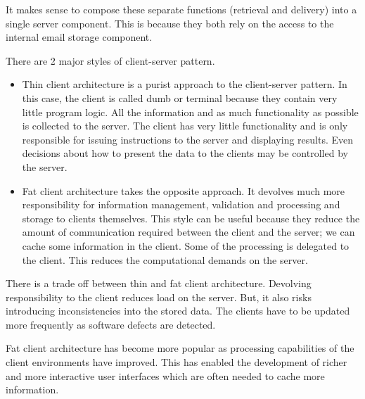 \documentclass[a4paper, openany]{memoir}
\begin{document}
It makes sense to compose these separate functions (retrieval and delivery) into a single server component. This is because they both rely on the access to the internal email storage component.

There are 2 major styles of client-server pattern.
\begin{itemize}
    \item Thin client architecture is a purist approach to the client-server pattern. In this case, the client is called dumb or terminal because they contain very little program logic. All the information and as much functionality as possible is collected to the server. The client has very little functionality and is only responsible for issuing instructions to the server and displaying results. Even decisions about how to present the data to the clients may be controlled by the server.
    \item Fat client architecture takes the opposite approach. It devolves much more responsibility for information management, validation and processing and storage to clients themselves. This style can be useful because they reduce the amount of communication required between the client and the server; we can cache some information in the client. Some of the processing is delegated to the client. This reduces the computational demands on the server.
\end{itemize}

There is a trade off between thin and fat client architecture. Devolving responsibility to the client reduces load on the server. But, it also risks introducing inconsistencies into the stored data. The clients have to be updated more frequently as software defects are detected.

Fat client architecture has become more popular as processing capabilities of the client environments have improved. This has enabled the development of richer and more interactive user interfaces which are often needed to cache more information.
\end{document}
